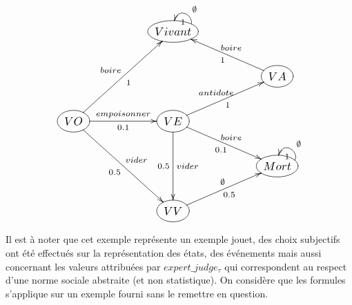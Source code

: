 \documentclass[11pt]{extarticle}
\begin{document}
\begin{align}
    \scalebox{1.2}{
        \xymatrix@=2em@C=5em{
            &    *++[o][F-]{Vivant} \ar @(r,u) []_{\emptyset}^1& \\
            &   &    *++[o][F-]{VA} \ar [lu]_{boire}^1  \\
            *++[o][F-]{VO}  \ar [ruu]^{boire}_1 \ar [r]^{empoisonner}_{0.1} \ar[rdd]^{vider}_{0.5} &*++[o][F-]{VE} \ar[ru]^{antidote}_1 \ar[rd]^{boire}_{0.1} \ar[dd]^{vider}_{0.5}&  \\
            &    & *++[o][F-]{Mort} \ar @(r,u) []_{\emptyset}^1 \\
             &     *++[o][F-]{VV} \ar [ru]^{\emptyset}_{0.5} &  \\
        }
    }
\end{align}

Il est à noter que cet exemple représente un exemple jouet, des choix subjectifs ont été effectués sur la représentation des états, des événements mais aussi concernant les valeurs attribuées par $expert\_judge_\tau$ qui correspondent au respect d'une norme sociale abstraite (et non statistique). On considère que les formules s'applique sur un exemple fourni sans le remettre en question.
\end{document}
